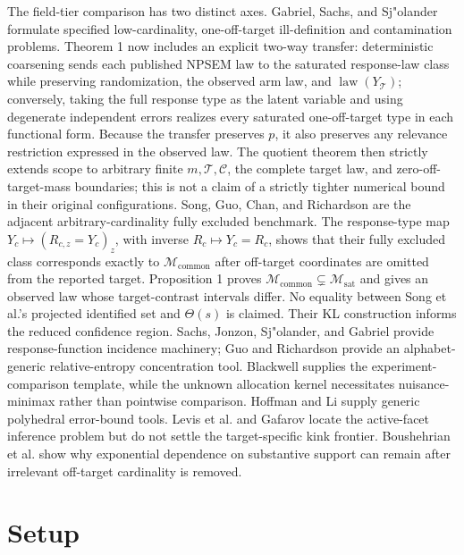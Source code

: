 \documentclass{article}
\begin{document}
The field-tier comparison has two distinct axes.  Gabriel, Sachs, and Sj"olander \cite{GabrielSachsSjolander2025} formulate specified low-cardinality, one-off-target ill-definition and contamination problems.  Theorem 1 now includes an explicit two-way transfer: deterministic coarsening sends each published NPSEM law to the saturated response-law class while preserving randomization, the observed arm law, and \(\operatorname{law}(Y_{\mathcal T})\); conversely, taking the full response type as the latent variable and using degenerate independent errors realizes every saturated one-off-target type in each functional form.  Because the transfer preserves \(p\), it also preserves any relevance restriction expressed in the observed law.  The quotient theorem then strictly extends scope to arbitrary finite \(m,\mathcal T,\mathcal C\), the complete target law, and zero-off-target-mass boundaries; this is not a claim of a strictly tighter numerical bound in their original configurations.  Song, Guo, Chan, and Richardson \cite{SongGuoChanRichardson2024} are the adjacent arbitrary-cardinality fully excluded benchmark.  The response-type map \(Y_c\mapsto(R_{c,z}=Y_c)_z\), with inverse \(R_c\mapsto Y_c=R_c\), shows that their fully excluded class corresponds exactly to \(\mathcal M_{\mathrm{common}}\) after off-target coordinates are omitted from the reported target.  Proposition 1 proves \(\mathcal M_{\mathrm{common}}\subsetneq\mathcal M_{\mathrm{sat}}\) and gives an observed law whose target-contrast intervals differ.  No equality between Song et al.'s projected identified set and \(\Theta(s)\) is claimed.  Their KL construction informs the reduced confidence region.  Sachs, Jonzon, Sj"olander, and Gabriel \cite{SachsJonzonSjolanderGabriel2023} provide response-function incidence machinery; Guo and Richardson \cite{GuoRichardson2021} provide an alphabet-generic relative-entropy concentration tool.  Blackwell \cite{Blackwell1953} supplies the experiment-comparison template, while the unknown allocation kernel necessitates nuisance-minimax rather than pointwise comparison.  Hoffman \cite{Hoffman1952} and Li \cite{Li1993} supply generic polyhedral error-bound tools.  Levis et al. \cite{LevisBonviniZengKeeleKennedy2025} and Gafarov \cite{Gafarov2025} locate the active-facet inference problem but do not settle the target-specific kink frontier.  Boushehrian et al. \cite{BoushehrianBadriAkbariKiyavash2026} show why exponential dependence on substantive support can remain after irrelevant off-target cardinality is removed.

\section{Setup}
\end{document}
